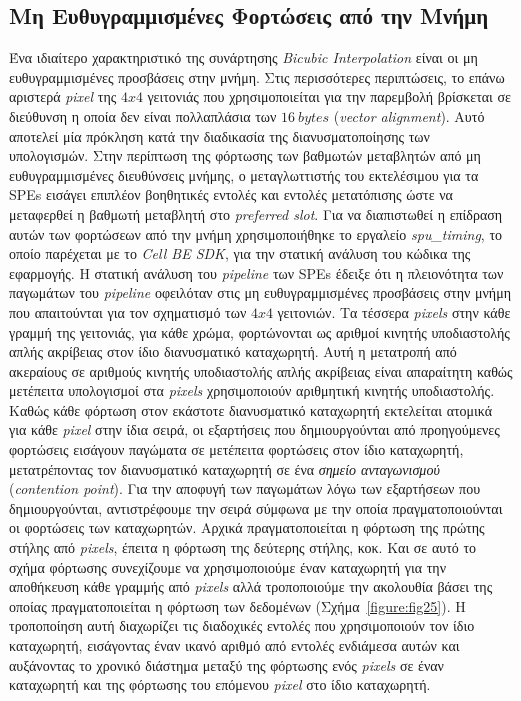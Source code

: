 \subsection[4.2.3 Μη Ευθυγραμμισμένες Φορτώσεις από την Μνήμη]{Μη Ευθυγραμμισμένες Φορτώσεις από την Μνήμη}
\label{subsection:sub423}
\indent
Ένα ιδιαίτερο χαρακτηριστικό της συνάρτησης \textsl{Bicubic Interpolation} είναι οι μη ευθυγραμμισμένες προσβάσεις στην μνήμη. Στις περισσότερες περιπτώσεις, το επάνω αριστερά \textsl{pixel} της \(4x4\) γειτονιάς που χρησιμοποιείται για την παρεμβολή βρίσκεται σε διεύθυνση η οποία δεν είναι πολλαπλάσια των \(16\ bytes\) (\textsl{vector alignment}). Αυτό αποτελεί μία πρόκληση κατά την διαδικασία της διανυσματοποίησης των υπολογισμών. Στην περίπτωση της φόρτωσης των βαθμωτών μεταβλητών από μη ευθυγραμμισμένες διευθύνσεις μνήμης, ο μεταγλωττιστής του εκτελέσιμου για τα \acp{SPE} εισάγει επιπλέον βοηθητικές εντολές και εντολές μετατόπισης ώστε να μεταφερθεί η βαθμωτή μεταβλητή στο \textsl{preferred slot}.\newline \indent 
Για να διαπιστωθεί η επίδραση αυτών των φορτώσεων από την μνήμη χρησιμοποιήθηκε το εργαλείο \textsl{spu\_timing}, το οποίο παρέχεται με το \textsl{Cell BE SDK}, για την στατική ανάλυση του κώδικα της εφαρμογής. Η στατική ανάλυση του \textsl{pipeline} των \acp{SPE} έδειξε ότι η πλειονότητα των παγωμάτων του \textsl{pipeline} οφειλόταν στις μη ευθυγραμμισμένες προσβάσεις στην μνήμη που απαιτούνται για τον σχηματισμό των \(4x4\) γειτονιών. Τα τέσσερα \textsl{pixels} στην κάθε γραμμή της γειτονιάς, για κάθε χρώμα, φορτώνονται ως αριθμοί κινητής υποδιαστολής απλής ακρίβειας στον ίδιο διανυσματικό καταχωρητή. Αυτή η μετατροπή από ακεραίους σε αριθμούς κινητής υποδιαστολής απλής ακρίβειας είναι απαραίτητη καθώς μετέπειτα υπολογισμοί στα \textsl{pixels} χρησιμοποιούν αριθμητική κινητής υποδιαστολής. Καθώς κάθε φόρτωση στον εκάστοτε διανυσματικό καταχωρητή εκτελείται ατομικά για κάθε \textsl{pixel} στην ίδια σειρά, οι εξαρτήσεις που δημιουργούνται από προηγούμενες φορτώσεις εισάγουν παγώματα σε μετέπειτα φορτώσεις στον ίδιο καταχωρητή, μετατρέποντας τον διανυσματικό καταχωρητή σε ένα \textsl{σημείο ανταγωνισμού} (\textsl{contention point}).\newline \indent
Για την αποφυγή των παγωμάτων λόγω των εξαρτήσεων που δημιουργούνται, αντιστρέφουμε την σειρά σύμφωνα με την οποία πραγματοποιούνται οι φορτώσεις των καταχωρητών. Αρχικά πραγματοποιείται η φόρτωση της πρώτης στήλης από \textsl{pixels}, έπειτα η φόρτωση της δεύτερης στήλης, κοκ. Και σε αυτό το σχήμα φόρτωσης συνεχίζουμε να χρησιμοποιούμε έναν καταχωρητή για την αποθήκευση κάθε γραμμής από \textsl{pixels} αλλά τροποποιούμε την ακολουθία βάσει της οποίας πραγματοποιείται η φόρτωση των δεδομένων (Σχήμα~\ref{figure:fig25}). Η τροποποίηση αυτή διαχωρίζει τις διαδοχικές εντολές που χρησιμοποιούν τον ίδιο καταχωρητή, εισάγοντας έναν ικανό αριθμό από εντολές ενδιάμεσα αυτών και αυξάνοντας το χρονικό διάστημα μεταξύ της φόρτωσης ενός \textsl{pixels} σε έναν καταχωρητή και της φόρτωσης του επόμενου \textsl{pixel} στο ίδιο καταχωρητή.\newline \indent 

